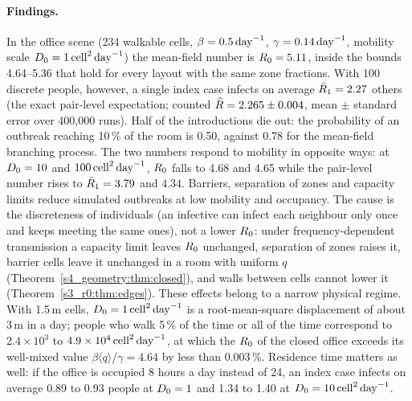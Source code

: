 \paragraph{Findings.}
In the office scene (234 walkable cells, $\beta=0.5\,\mathrm{day}^{-1}$, $\gamma=0.14\,\mathrm{day}^{-1}$, mobility scale
$D_0=1\,\mathrm{cell}^2\,\mathrm{day}^{-1}$) the mean-field number is $R_0=5.11$, inside the bounds 4.64--5.36 that hold for every layout
with the same zone fractions.
With 100 discrete people, however, a single index case infects on average $\bar{R}_1=2.27$ others (the exact
pair-level expectation; counted $\widehat{R}=2.265\pm0.004$, mean $\pm$ standard error over 400{,}000 runs).
Half of the introductions die out: the probability of an outbreak reaching 10\,\% of the room is 0.50,
against 0.78 for the mean-field branching process.
The two numbers respond to mobility in opposite ways: at $D_0=10$ and $100\,\mathrm{cell}^2\,\mathrm{day}^{-1}$, $R_0$ falls to 4.68 and
4.65 while the pair-level number rises to $\bar{R}_1=3.79$ and $4.34$.
Barriers, separation of zones and capacity limits reduce simulated outbreaks at low mobility and occupancy.
The cause is the discreteness of individuals (an infective can infect each neighbour only once and keeps
meeting the same ones), not a lower $R_0$: under frequency-dependent transmission a capacity limit leaves
$R_0$ unchanged, separation of zones raises it, barrier cells leave it unchanged in a room with uniform $q$
(Theorem~\ref{s4_geometry:thm:closed}), and walls between cells cannot lower it
(Theorem~\ref{s3_r0:thm:edges}).
These effects belong to a narrow physical regime. With 1.5\,m cells, $D_0=1\,\mathrm{cell}^2\,\mathrm{day}^{-1}$ is a root-mean-square
displacement of about 3\,m in a day; people who walk 5\,\% of the time or all of the time correspond to
$2.4\times10^{3}$ to $4.9\times10^{4}\,\mathrm{cell}^2\,\mathrm{day}^{-1}$, at which the $R_0$ of the closed office exceeds its well-mixed
value $\beta\langle q\rangle/\gamma=4.64$ by less than 0.003\,\%.
Residence time matters as well: if the office is occupied 8 hours a day instead of 24, an index case infects
on average 0.89 to 0.93 people at $D_0=1$ and 1.34 to 1.40 at $D_0=10\,\mathrm{cell}^2\,\mathrm{day}^{-1}$.

